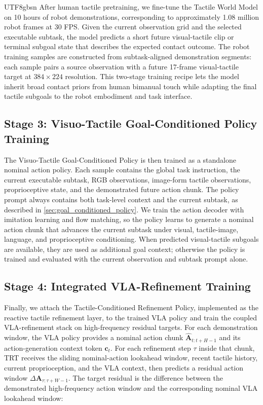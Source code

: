 \documentclass[]{mpai_report}
\begin{document}
\begin{CJK*}{UTF8}{gbsn}
After human tactile pretraining, we fine-tune the Tactile World Model on 10 hours of robot demonstrations, corresponding to approximately 1.08 million robot frames at 30 FPS.
Given the current observation grid and the selected executable subtask, the model predicts a short future visual-tactile clip or terminal subgoal state that describes the expected contact outcome.
The robot training samples are constructed from subtask-aligned demonstration segments: each sample pairs a source observation with a future 17-frame visual-tactile target at $384\times224$ resolution.
This two-stage training recipe lets the model inherit broad contact priors from human bimanual touch while adapting the final tactile subgoals to the robot embodiment and task interface.

\subsection{Stage 3: Visuo-Tactile Goal-Conditioned Policy Training}

The Visuo-Tactile Goal-Conditioned Policy is then trained as a standalone nominal action policy.
Each sample contains the global task instruction, the current executable subtask, RGB observations, image-form tactile observations, proprioceptive state, and the demonstrated future action chunk.
The policy prompt always contains both task-level context and the current subtask, as described in \cref{sec:goal_conditioned_policy}.
We train the action decoder with imitation learning and flow matching, so the policy learns to generate a nominal action chunk that advances the current subtask under visual, tactile-image, language, and proprioceptive conditioning.
When predicted visual-tactile subgoals are available, they are used as additional goal context; otherwise the policy is trained and evaluated with the current observation and subtask prompt alone.

\subsection{Stage 4: Integrated VLA-Refinement Training}

Finally, we attach the Tactile-Conditioned Refinement Policy, implemented as the reactive tactile refinement layer, to the trained VLA policy and train the coupled VLA-refinement stack on high-frequency residual targets.
For each demonstration window, the VLA policy provides a nominal action chunk $\hat{\mathbf{A}}_{t:t+H-1}$ and its action-generation context token $\mathbf{c}_t$.
For each refinement step $\tau$ inside that chunk, TRT receives the sliding nominal-action lookahead window, recent tactile history, current proprioception, and the VLA context, then predicts a residual action window $\Delta\mathbf{A}_{\tau:\tau+W-1}$.
The target residual is the difference between the demonstrated high-frequency action window and the corresponding nominal VLA lookahead window:


\end{CJK*}
\end{document}

